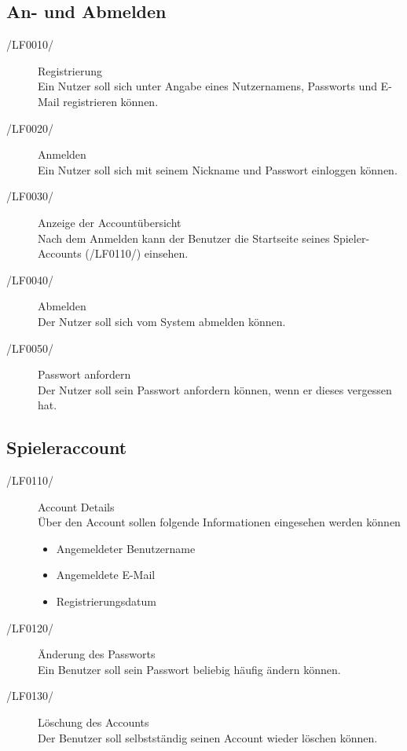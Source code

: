 \documentclass[11pt,a4paper]{scrreprt}
\begin{document}
\subsection{An- und Abmelden}
\begin{description}
\item[/LF0010/] Registrierung \\
Ein Nutzer soll sich unter Angabe eines Nutzernamens, Passworts und E-Mail registrieren können.

\item[/LF0020/] Anmelden \\
Ein Nutzer soll sich mit seinem Nickname und Passwort einloggen können.

\item[/LF0030/] Anzeige der Accountübersicht \\
Nach dem Anmelden kann der Benutzer die Startseite seines Spieler-Accounts (/LF0110/) einsehen.

\item[/LF0040/] Abmelden \\
Der Nutzer soll sich vom System abmelden können.

\item[/LF0050/] Passwort anfordern \\
Der Nutzer soll sein Passwort anfordern können, wenn er dieses vergessen hat.
\end{description}

\subsection{Spieleraccount}
\begin{description}
\item[/LF0110/] Account Details \\
Über den Account sollen folgende Informationen eingesehen werden können
	\begin{itemize}
	\item Angemeldeter Benutzername
	\item Angemeldete E-Mail
	\item Registrierungsdatum
	\end{itemize}
	
\item[/LF0120/] Änderung des Passworts \\
Ein Benutzer soll sein Passwort beliebig häufig ändern können.

\item[/LF0130/] Löschung des Accounts \\
Der Benutzer soll selbstständig seinen Account wieder löschen können.
\end{description}
\end{document}
